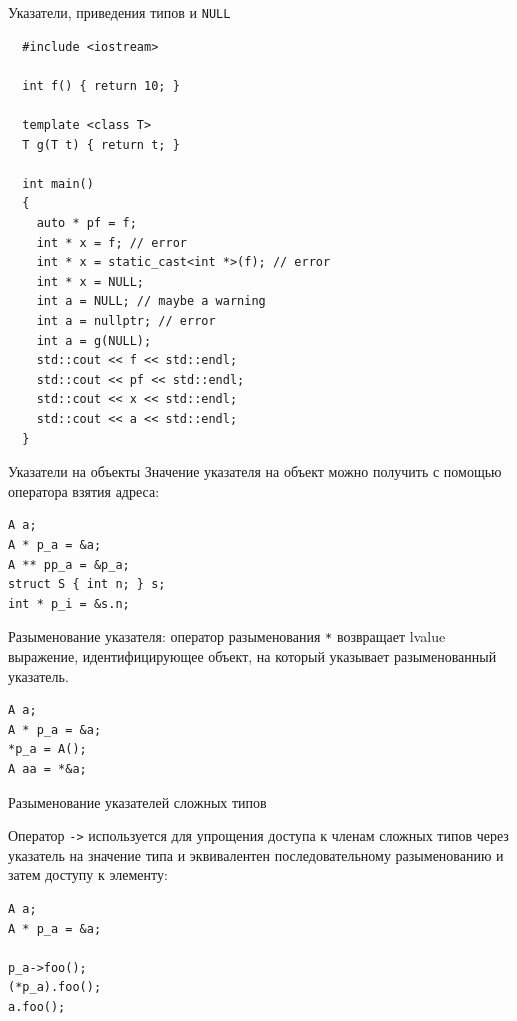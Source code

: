 \documentclass[unknownkeysallowed,xcolor=table]{beamer}
\begin{document}
\begin{frame}[fragile]{Указатели, приведения типов и \lstinline{NULL}}
  \begin{lstlisting}
  #include <iostream>

  int f() { return 10; }

  template <class T>
  T g(T t) { return t; }

  int main()
  {
    auto * pf = f;
    int * x = f; // error
    int * x = static_cast<int *>(f); // error
    int * x = NULL;
    int a = NULL; // maybe a warning
    int a = nullptr; // error
    int a = g(NULL);
    std::cout << f << std::endl;
    std::cout << pf << std::endl;
    std::cout << x << std::endl;
    std::cout << a << std::endl;
  }
  \end{lstlisting}
\end{frame}

\begin{frame}[fragile]{Указатели на объекты}
Значение указателя на объект можно получить с помощью оператора взятия адреса:

\begin{lstlisting}
A a;
A * p_a = &a;
A ** pp_a = &p_a;
struct S { int n; } s;
int * p_i = &s.n;
\end{lstlisting}

Разыменование указателя: оператор разыменования \lstinline{*} возвращает lvalue выражение, идентифицирующее объект, на который указывает разыменованный указатель.

\begin{lstlisting}
A a;
A * p_a = &a;
*p_a = A();
A aa = *&a;
\end{lstlisting}

\end{frame}

\begin{frame}[fragile]{Разыменование указателей сложных типов}

Оператор \lstinline{->} используется для упрощения доступа к членам сложных типов через указатель на значение типа и эквивалентен последовательному разыменованию и затем доступу к элементу:

\vspace{1em}

\begin{lstlisting}
A a;
A * p_a = &a;

p_a->foo();
(*p_a).foo();
a.foo();
\end{lstlisting}

\end{frame}
\end{document}
